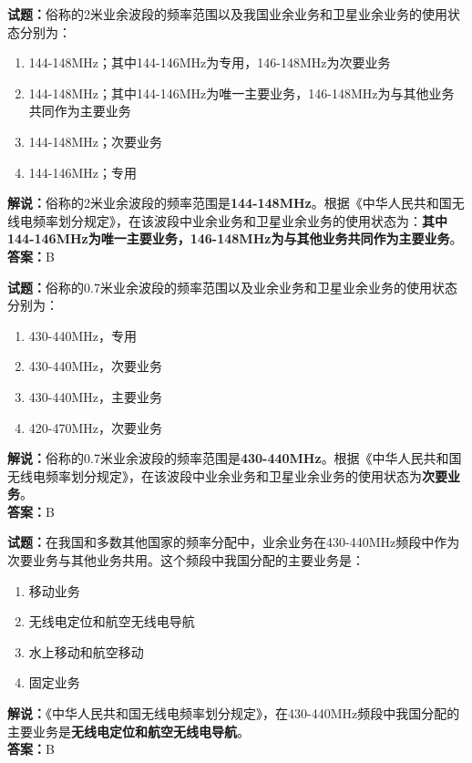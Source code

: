 \documentclass{ctexbook}
\begin{document}
\bigskip


\noindent\textbf{试题：}俗称的2米业余波段的频率范围以及我国业余业务和卫星业余业务的使用状态分别为：
\begin{enumerate}[leftmargin=3em]
	\item 144-148MHz；其中144-146MHz为专用，146-148MHz为次要业务
	\item 144-148MHz；其中144-146MHz为唯一主要业务，146-148MHz为与其他业务共同作为主要业务
	\item 144-148MHz；次要业务
	\item 144-146MHz；专用
\end{enumerate}
\noindent\textbf{解说：}俗称的2米业余波段的频率范围是\textbf{144-148MHz}。根据《中华人民共和国无线电频率划分规定》，在该波段中业余业务和卫星业余业务的使用状态为：\textbf{其中144-146MHz为唯一主要业务，146-148MHz为与其他业务共同作为主要业务}。\\\noindent\textbf{答案：}B


\bigskip


\noindent\textbf{试题：}俗称的0.7米业余波段的频率范围以及业余业务和卫星业余业务的使用状态分别为：
\begin{enumerate}[leftmargin=3em]
	\item 430-440MHz，专用
	\item 430-440MHz，次要业务
	\item 430-440MHz，主要业务
	\item 420-470MHz，次要业务
\end{enumerate}
\noindent\textbf{解说：}俗称的0.7米业余波段的频率范围是\textbf{430-440MHz}。根据《中华人民共和国无线电频率划分规定》，在该波段中业余业务和卫星业余业务的使用状态为\textbf{次要业务}。\\\noindent\textbf{答案：}B


\bigskip


\noindent\textbf{试题：}在我国和多数其他国家的频率分配中，业余业务在430-440MHz频段中作为次要业务与其他业务共用。这个频段中我国分配的主要业务是：
\begin{enumerate}[leftmargin=3em]
	\item 移动业务
	\item 无线电定位和航空无线电导航
	\item 水上移动和航空移动
	\item 固定业务
\end{enumerate}
\noindent\textbf{解说：}《中华人民共和国无线电频率划分规定》，在430-440MHz频段中我国分配的主要业务是\textbf{无线电定位和航空无线电导航}。\\\noindent\textbf{答案：}B
\end{document}
